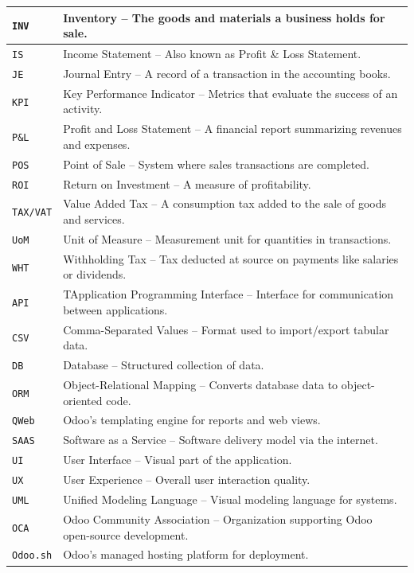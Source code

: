 \documentclass[11pt,a4paper]{article}
\begin{document}
\begin{longtable}{|l|p{13cm}|}
    \texttt{INV} & Inventory – The goods and materials a business holds for sale. \\
    \hline
    \texttt{IS} & Income Statement – Also known as Profit \& Loss Statement. \\
    \hline
    \texttt{JE} & Journal Entry – A record of a transaction in the accounting books. \\
    \hline
    \texttt{KPI} & Key Performance Indicator – Metrics that evaluate the success of an activity. \\
    \hline
    \texttt{P\&L} & Profit and Loss Statement – A financial report summarizing revenues and expenses. \\
    \hline
    \texttt{POS} & Point of Sale – System where sales transactions are completed. \\
    \hline
    \texttt{ROI} & Return on Investment – A measure of profitability. \\
    \hline
    \texttt{TAX/VAT} & Value Added Tax – A consumption tax added to the sale of goods and services. \\
    \hline
    \texttt{UoM} & Unit of Measure – Measurement unit for quantities in transactions. \\
    \hline
    \texttt{WHT} & Withholding Tax – Tax deducted at source on payments like salaries or dividends. \\
    \hline
    \texttt{API} & TApplication Programming Interface – Interface for communication between applications. \\
    \hline
    \texttt{CSV} & Comma-Separated Values – Format used to import/export tabular data. \\
    \hline
    \texttt{DB} & Database – Structured collection of data. \\
    \hline
    \texttt{ORM} & Object-Relational Mapping – Converts database data to object-oriented code. \\
    \hline
    \texttt{QWeb} & Odoo’s templating engine for reports and web views. \\
    \hline
    \texttt{SAAS} & Software as a Service – Software delivery model via the internet. \\
    \hline
    \texttt{UI} & User Interface – Visual part of the application. \\
    \hline
    \texttt{UX} & User Experience – Overall user interaction quality. \\
    \hline
    \texttt{UML} & Unified Modeling Language – Visual modeling language for systems. \\
    \hline
    \texttt{OCA} & Odoo Community Association – Organization supporting Odoo open-source development. \\
    \hline
    \texttt{Odoo.sh} & Odoo’s managed hosting platform for deployment. \\
    \hline
\end{longtable}
\end{document}
